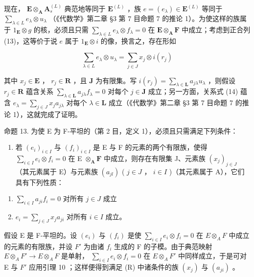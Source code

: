 现在， \(\mathbf{E} \otimes_{\mathbf{A}} \mathbf{A}_{s}^{(L)}\) 典范地等同于 \(\mathbf{E}^{(L)}\) ，族 \(e = (e_{\lambda}) \in \mathbf{E}^{(L)}\) 等同于 \(\sum_{\lambda \in L} e_{\lambda} \otimes u_{\lambda}\) （《代数学》第二章 §3 第 7 目命题 7 的推论 1）。为使这样的族属于 \(1_{\mathbf{E}} \otimes g\) 的核，必须且只需 \(\sum_{\lambda \in L} e_{\lambda} \otimes f_{\lambda} = 0\) 在 \(\mathbf{E} \otimes_{\mathbf{A}} \mathbf{F}\) 中成立；考虑到正合列 (13)，这等价于说 \(e\) 属于 \(1_{\mathbf{E}} \otimes i\) 的像，换言之，存在形如

\[
\sum_ {\lambda \in L} e _ {\lambda} \otimes u _ {\lambda} = \sum_ {j \in J} x _ {j} \otimes i (r _ {j})\tag{14}
\]

其中 \(x_{j} \in \mathbf{E}\) ， \(r_{j} \in \mathbf{R}\) ，且 \(\mathbf{J}\) 为有限集。写 \(i(r_{j}) = \sum_{\lambda \in \mathbf{L}} a_{j\lambda} u_{\lambda}\) ，则假设 \(r_{j} \in \mathbf{R}\) 蕴含关系 \(\sum_{\lambda \in \mathbf{L}} a_{j\lambda} f_{\lambda} = 0\) 对每个 \(j \in \mathbf{J}\) 成立；另一方面，关系式 (14) 蕴含 \(e_{\lambda} = \sum_{j \in J} x_{j} a_{j\lambda}\) 对每个 \(\lambda \in \mathbf{L}\) 成立（《代数学》第二章 §3 第 7 目命题 7 的推论 1），这就完成了证明。

命题 13. 为使 E 为 F-平坦的（第 2 目，定义 1），必须且只需满足下列条件：

\begin{enumerate}
\def\labelenumi{(\Alph{enumi})}
\setcounter{enumi}{17}
\tightlist
\item
  若 \((e_i)_{i \in I}\) 与 \((f_i)_{i \in I}\) 是 E 与 F 的元素的两个有限族，使得 \(\sum_{i \in I} e_i \otimes f_i = 0\) 在 E \(\otimes_{\mathbf{A}} \mathbf{F}\) 中成立，则存在有限集 J、元素族 \((x_j)_{j \in J}\) （其元素属于 E）与元素族 \((a_{jl})\) ( \(j \in J\) ， \(i \in I\) )（其元素属于 A），它们具有下列性质：
\end{enumerate}

\begin{enumerate}
\def\labelenumi{(\arabic{enumi})}
\item
  \(\sum_{i\in I}a_{ji}f_i = 0\) 对所有 \(j\in J\) 成立
\item
  \(e_i = \sum_{j \in J} x_j a_{ji}\) 对所有 \(i \in I\) 成立。
\end{enumerate}

假设 E 是 F-平坦的。设 \((e_{i})\) 与 \((f_{i})\) 是使 \(\sum_{i\in I}e_{i}\otimes f_{i}=0\) 在 \(E\otimes_{A}F\) 中成立的元素的有限族，并设 \(F'\) 为由诸 \(f_{i}\) 生成的 F 的子模。由于典范映射 \(E\otimes_{A}F'\to E\otimes_{A}F\) 是单射， \(\sum_{i\in I}e_{i}\otimes f_{i}=0\) 在 \(E\otimes_{A}F'\) 中同样成立，于是可对 E 与 \(F'\) 应用引理 10 ；这样便得到满足 (R) 中诸条件的族 \((x_{j})\) 与 \((a_{ji})\) 。

